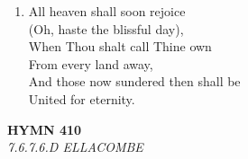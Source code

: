 \documentclass[11pt,a4paper]{article}
\begin{document}
\begin{enumerate}
    \item All heaven shall soon rejoice \\
        (Oh, haste the blissful day), \\
        When Thou shalt call Thine own \\
        From every land away, \\
        And those now sundered then shall be \\
        United for eternity.

\end{enumerate}

\newpage
\begin{center}
    {\Large \textbf{HYMN 410}}
    \\
    \textit{7.6.7.6.D ELLACOMBE}
\end{center}
\vspace{1em}
\end{document}
